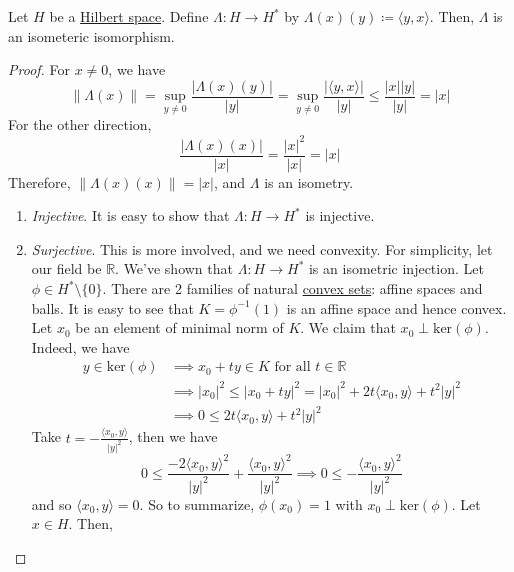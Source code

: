 	\begin{theorem}
	  \label{thm:lp-duality}
	  Let $H$ be a \hyperref[def:hilbert-space]{Hilbert space}. Define $\Lambda: H \to H^\ast$ by $\Lambda(x)(y) \coloneqq \langle y, x \rangle$. Then, $\Lambda$ is an isometeric isomorphism. 
	\end{theorem}
	\begin{proof}
	  For $x \neq 0$, we have 
		\begin{equation}
			\|\Lambda (x)\| = \sup_{y \neq 0} \frac{|\Lambda(x)(y)|}{|y|} = \sup_{y \neq 0} \frac{|\langle y, x \rangle|}{|y|} \leq \frac{|x||y|} {|y|} = |x|
		\end{equation}
		For the other direction, 
		\begin{equation}
			\frac{|\Lambda(x)(x)|}{|x|} = \frac{|x|^2}{|x|} = |x|
		\end{equation}
		Therefore, $\|\Lambda(x)(x)\| = |x|$, and $\Lambda$ is an isometry. 
		\begin{enumerate}
		  \item \textit{Injective}. It is easy to show that $\Lambda: H \to H^\ast$ is injective. 
			\item \textit{Surjective}. This is more involved, and we need convexity. For simplicity, let our field be $\mathbb{R}$. We've shown that $\Lambda: H \to H^\ast$ is an isometric injection. Let $\phi \in H^\ast \setminus \{0\}$. There are 2 families of natural \hyperref[st-def:convex-sets]{convex sets}: affine spaces and balls. It is easy to see that $K = \phi^{-1} (1)$ is an affine space and hence convex. Let $x_0$ be an element of minimal norm of $K$. We claim that $x_0 \perp \mathrm{ker}(\phi)$. Indeed, we have 
				\begin{align}
					y \in \mathrm{ker}(\phi) & \implies x_0 + ty \in K \text{ for all } t \in \mathbb{R} \\ 
																	 & \implies |x_0|^2 \leq |x_0 + ty|^2 = |x_0|^2 + 2t \langle x_0, y \rangle + t^2 |y|^2 \\ 
																	 & \implies 0 \leq 2t \langle x_0, y \rangle + t^2 |y|^2
				\end{align}
				Take $t = -\frac{\langle x_0, y \rangle}{|y|^2}$, then we have 
				\begin{equation}
					0 \leq \frac{-2 \langle x_0, y \rangle^2}{|y|^2} + \frac{\langle x_0, y \rangle^2}{|y|^2} \implies 0 \leq - \frac{\langle x_0, y \rangle^2}{|y|^2} 
				\end{equation}
				and so $\langle x_0, y \rangle = 0$. So to summarize, $\phi(x_0) = 1$ with $x_0 \perp \mathrm{ker}(\phi)$. Let $x \in H$. Then, 

\end{enumerate}
\end{proof}
